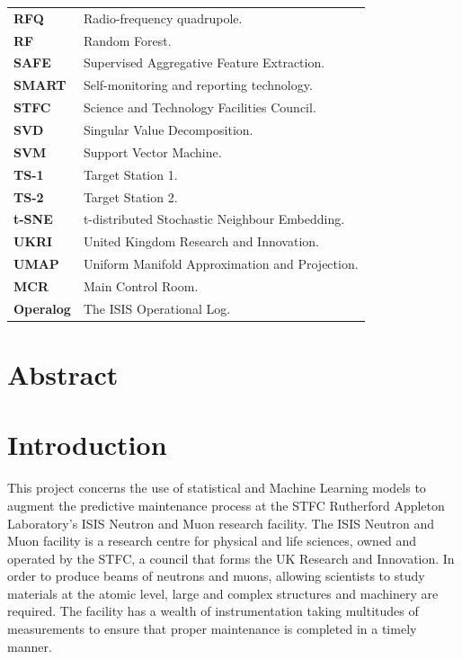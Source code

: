 \documentclass[10pt,oneside]{report}
\begin{document}
\begin{table}[ht]
\begin{tabular}{ll}
        \textbf{RFQ} & Radio-frequency quadrupole. \\
        \textbf{RF} & Random Forest. \\
        \textbf{SAFE} & Supervised Aggregative Feature Extraction. \\
        \textbf{SMART} & Self-monitoring and reporting technology. \\
        \textbf{STFC} & Science and Technology Facilities Council. \\
        \textbf{SVD} & Singular Value Decomposition. \\
        \textbf{SVM} & Support Vector Machine. \\
        \textbf{TS-1} & Target Station 1. \\
        \textbf{TS-2} & Target Station 2. \\
        \textbf{t-SNE} & t-distributed Stochastic Neighbour Embedding. \\
        \textbf{UKRI} & United Kingdom Research and Innovation. \\
        \textbf{UMAP} & Uniform Manifold Approximation and Projection. \\
        \textbf{MCR} & Main Control Room. \\
        \textbf{Operalog} & The ISIS Operational Log. \\

    \end{tabular}
\end{table}

\clearpage


\chapter*{Abstract}


\chapter{Introduction}

This project concerns the use of statistical and Machine Learning models to augment the predictive maintenance process at the STFC Rutherford Appleton Laboratory's ISIS Neutron and Muon research facility. The ISIS Neutron and Muon facility is a research centre for physical and life sciences, owned and operated by the STFC, a council that forms the UK Research and Innovation. In order to produce beams of neutrons and muons, allowing scientists to study materials at the atomic level, large and complex structures and machinery are required. The facility has a wealth of instrumentation taking multitudes of measurements to ensure that proper maintenance is completed in a timely manner. \\
\end{document}
